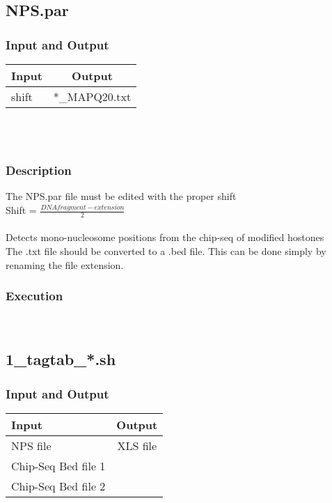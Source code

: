 \documentclass[14pt]{article}
\begin{document}
\subsection{NPS.par}
\subsubsection{Input and Output}
\begin{tabular}{l |c }
Input & Output \\
\hline
shift & *\_MAPQ20.txt\\
\end{tabular}\\
\\
\subsubsection{Description}
The NPS.par file must be edited with the proper shift\\

Shift = $\frac{DNA fragment -  extension}{2}$
\\
\\
Detects mono-nucleosome positions from the chip-seq of modified hostones\\
The .txt file should be converted to a .bed file. This can be done simply by renaming the file extension.
\\
\subsubsection{Execution}
\\

\subsection{1\_tagtab\_*.sh}
\subsubsection{Input and Output}
\begin{tabular}{l |c }
Input & Output \\
\hline
NPS file& XLS file\\
Chip-Seq Bed file 1\\ 
Chip-Seq Bed file 2\\
\end{tabular}\\
\\
\end{document}
